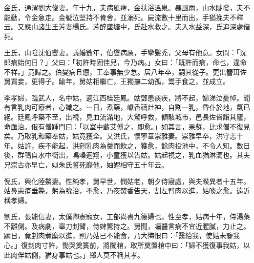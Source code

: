 \begin{pinyinscope}
金氏，通渭劉大俊妻。年十九，夫病風痺，金扶浴溫泉。暴風雨，山水陡發，夫不能動，令金急走。金號泣堅持不肯舍，並溺死。屍流數十里而出，手猶挽夫不釋云。又應山諸生王芳妻楊氏。芳醉墜塘中，氏赴水救之。夫入水益深，氏追深處偕死。

王氏，山陰沈伯燮妻。議婚數年，伯燮病厲，手攣髮禿，父母有他意。女問：「沈郎病始何日？」父曰：「初許時固佳兒，今乃病。」女曰：「既許而病，命也，違命不祥。」竟歸之。伯燮病且憊，王奉事無少怠。居八年卒，嗣其從子。更出簪珥佐舅買妾，更得子。踰年，舅姑相繼亡，王獨撫二幼孤，鬻手食之，並成立。

李孝婦，臨武人，名中姑，適江西桂廷鳳。姑鄧患痰疾，將不起，婦涕泣憂悼。聞有言乳肉可療者，心識之。一日，煮藥，巘香禱灶神，自割一乳，昏仆於地，氣已絕。廷鳳呼藥不至，出視，見血流滿地，大驚呼救，傾駭城市，邑長佐皆詣其廬，命亟治。俄有僧踵門曰：「以室中蘄艾傅之，即愈。」如其言，果蘇，比求僧不復見矣。乃取乳和藥奉姑，姑竟獲全。又洪氏，懷寧章崇雅妻。崇雅早卒，洪守志十年。姑許，疾不能起，洪剜乳肉為羹而飲之，獲愈，餘肉投池中，不令人知。數日後，群鴨自水中銜出，鳴噪迴翔，小童獲以告姑。姑起視之，乳血猶淋漓也。其夫兄崇古亦早亡，姒朱氏誓死靡他，妯娌相守五十年云。

倪氏，興化陸鰲妻。性純孝，舅早世，憫姑老，朝夕侍寢處，與夫睽異者十五年。姑鼻患疽垂斃，躬為吮治，不愈，乃夜焚香告天，割左臂肉以進，姑啖之愈。遠近稱孝婦。

劉氏，張能信妻，太僕卿憲寵女，工部尚書九德婦也。性至孝，姑病十年，侍湯藥不離側。及病劇，舉刀刲臂，侍婢驚持之。舅聞，囑醫言病不宜近腥膩，力止之。踰日，竟刲肉煮糜以進，則乃姑已不能食，乃大悔恨曰：「醫紿我，使姑未鑒我心。」復刲肉寸許，慟哭奠簀前，將闔棺，取所奠置棺中曰：「婦不獲復事我姑，以此肉伴姑側，猶身事姑也。」鄉人莫不稱其孝。


\end{pinyinscope}